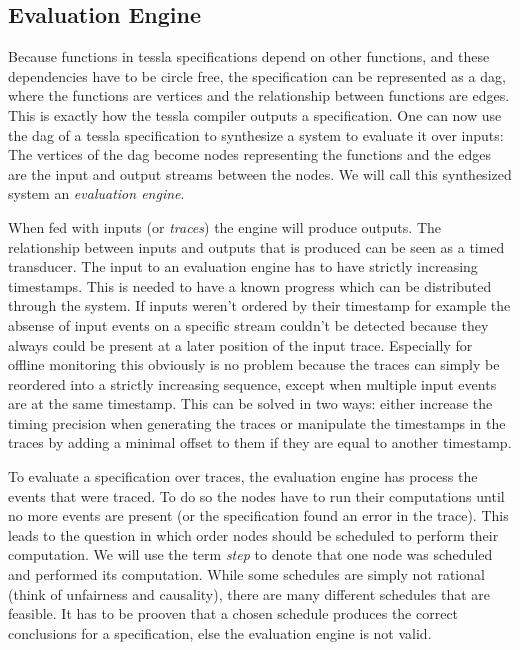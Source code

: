 
\subsection{ Evaluation Engine}
\label{sec:concepts:def:eval_engine}

Because functions in \gls{tessla} specifications depend on other functions, and these dependencies have to be circle free, the specification can be represented as a \gls{dag}, where the functions are vertices and the relationship between functions are edges.
This is exactly how the \gls{tessla} compiler outputs a specification.
One can now use the \gls{dag} of a \gls{tessla} specification to synthesize a system to evaluate it over inputs:
The vertices of the \gls{dag} become nodes representing the functions and the edges are the input and output streams between the nodes.
We will call this synthesized system an \emph{evaluation engine}.

When fed with inputs (or \emph{traces}) the engine will produce outputs.
The relationship between inputs and outputs that is produced can be seen as a timed transducer.
The input to an evaluation engine has to have strictly increasing timestamps.
This is needed to have a known progress which can be distributed through the system.
If inputs weren't ordered by their timestamp for example the absense of input events on a specific stream couldn't be detected because they always could be present at a later position of the input trace.
Especially for offline monitoring this obviously is no problem because the traces can simply be reordered into a strictly increasing sequence, except when multiple input events are at the same timestamp.
This can be solved in two ways: either increase the timing precision when generating the traces or manipulate the timestamps in the traces by adding a minimal offset to them if they are equal to another timestamp.

To evaluate a specification over traces, the evaluation engine has process the events that were traced.
To do so the nodes have to run their computations until no more events are present (or the specification found an error in the trace).
This leads to the question in which order nodes should be scheduled to perform their computation.
We will use the term \emph{step} to denote that one node was scheduled and performed its computation.
While some schedules are simply not rational (think of unfairness and causality), there are many different schedules that are feasible.
It has to be prooven that a chosen schedule produces the correct conclusions for a specification, else the evaluation engine is not valid.

